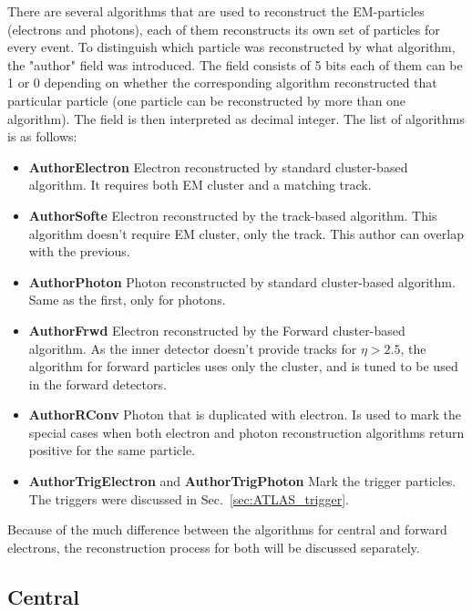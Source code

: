 There are several algorithms that are used to reconstruct the EM-particles (electrons and photons), each of them reconstructs its own set of particles for every event. To distinguish which particle was reconstructed by what algorithm, the "author" field was introduced. The field consists of 5 bits each of them can be 1 or 0 depending on whether the corresponding algorithm reconstructed that particular particle (one particle can be reconstructed by more than one algorithm). The field is then interpreted as decimal integer. The list of algorithms is as follows:
\begin{itemize}
\item {\bfseries AuthorElectron} Electron reconstructed by standard cluster-based algorithm. It requires both EM cluster and a matching track.
\item {\bfseries AuthorSofte} Electron reconstructed by the track-based algorithm. This algorithm doesn't require EM cluster, only the track. This author can overlap with the previous.
\item {\bfseries AuthorPhoton} Photon reconstructed by standard cluster-based algorithm. Same as the first, only for photons.
\item {\bfseries AuthorFrwd} Electron reconstructed by the Forward cluster-based algorithm. As the inner detector doesn't provide tracks for $\eta > 2.5$, the algorithm for forward particles uses only the cluster, and is tuned to be used in the forward detectors.
\item {\bfseries AuthorRConv} Photon that is duplicated with electron. Is used to mark the special cases when both electron and photon reconstruction algorithms return positive for the same particle.
\item {\bfseries AuthorTrigElectron} and {\bfseries AuthorTrigPhoton} Mark the trigger particles. The triggers were discussed in Sec.~\ref{sec:ATLAS_trigger}.
\end{itemize}

Because of the much difference between the algorithms for central and forward electrons, the reconstruction process for both will be discussed separately.

\subsection{Central}

